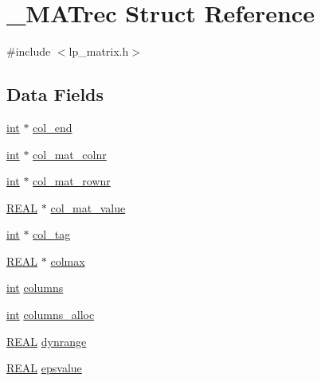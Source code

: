 \hypertarget{struct___m_a_trec}{}\section{\+\_\+\+M\+A\+Trec Struct Reference}
\label{struct___m_a_trec}


{\ttfamily \#include $<$lp\+\_\+matrix.\+h$>$}

\subsection*{Data Fields}
\begin{DoxyCompactItemize}
\item 
\hyperlink{lp__lib_8h_adeb9ec6400320e4923ac9d836d509ddb}{int} $\ast$ \hyperlink{struct___m_a_trec_ad31752d01bf45a9cccbb1f46b81454fe}{col\+\_\+end}
\item 
\hyperlink{lp__lib_8h_adeb9ec6400320e4923ac9d836d509ddb}{int} $\ast$ \hyperlink{struct___m_a_trec_aa6f69868404fd9d5b5ca643fc24a8318}{col\+\_\+mat\+\_\+colnr}
\item 
\hyperlink{lp__lib_8h_adeb9ec6400320e4923ac9d836d509ddb}{int} $\ast$ \hyperlink{struct___m_a_trec_a23f8ea17b2b045adfaa21b2d99e2d619}{col\+\_\+mat\+\_\+rownr}
\item 
\hyperlink{lp__lib_8h_a92bd5e363d131fa73669358edb232dce}{R\+E\+AL} $\ast$ \hyperlink{struct___m_a_trec_a3cdceaf04a01ed1c6497de939c08604f}{col\+\_\+mat\+\_\+value}
\item 
\hyperlink{lp__lib_8h_adeb9ec6400320e4923ac9d836d509ddb}{int} $\ast$ \hyperlink{struct___m_a_trec_a3c14b91e38324c827e032bbc5042e95a}{col\+\_\+tag}
\item 
\hyperlink{lp__lib_8h_a92bd5e363d131fa73669358edb232dce}{R\+E\+AL} $\ast$ \hyperlink{struct___m_a_trec_a0a481654cbc3d98945bf30535d1de54f}{colmax}
\item 
\hyperlink{lp__lib_8h_adeb9ec6400320e4923ac9d836d509ddb}{int} \hyperlink{struct___m_a_trec_a9cfed8c980e2dbe8dbc66211e33936a7}{columns}
\item 
\hyperlink{lp__lib_8h_adeb9ec6400320e4923ac9d836d509ddb}{int} \hyperlink{struct___m_a_trec_aa0db05d83b5eb4589abbd93ac76d0bef}{columns\+\_\+alloc}
\item 
\hyperlink{lp__lib_8h_a92bd5e363d131fa73669358edb232dce}{R\+E\+AL} \hyperlink{struct___m_a_trec_a840551306fa6b2f4679334983634c7aa}{dynrange}
\item 
\hyperlink{lp__lib_8h_a92bd5e363d131fa73669358edb232dce}{R\+E\+AL} \hyperlink{struct___m_a_trec_ae133fdcab4ebbdc8af2c61ef3a511fb4}{epsvalue}

\end{DoxyCompactItemize}
